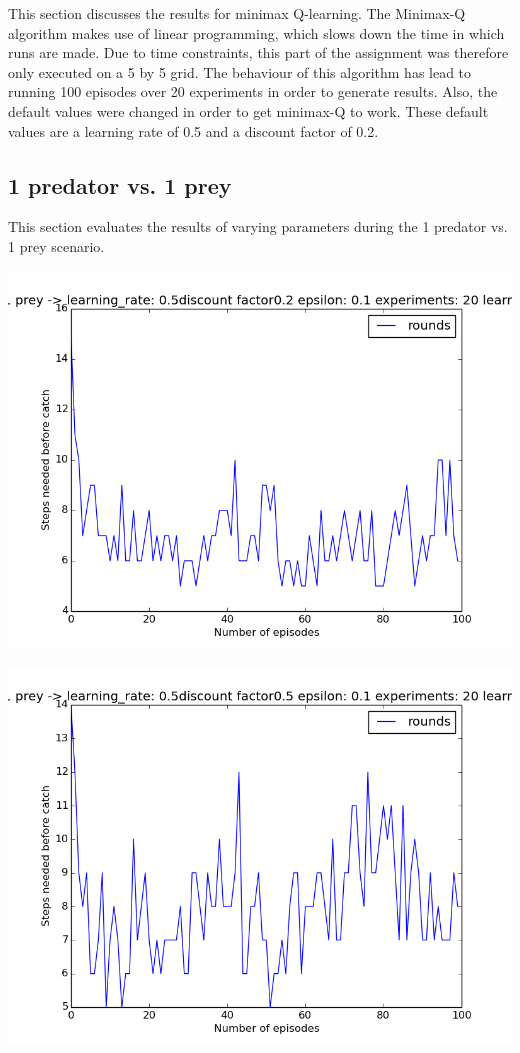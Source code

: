 This section discusses the results for minimax Q-learning. The Minimax-Q algorithm makes use of linear programming, which slows down the time in which runs are made. Due to time constraints, this part of the assignment was therefore only executed on a 5 by 5 grid. 
The behaviour of this algorithm has lead to running 100 episodes over 20 experiments in order to generate results. Also, the default values were changed in order to get minimax-Q to work. These default values are a learning rate of 0.5 and a discount factor of 0.2.

\subsection{1 predator vs. 1 prey}
This section evaluates the results of varying parameters during the 1 predator vs. 1 prey scenario.
\begin{center}
	\includegraphics[scale=0.3]{minimax_100rounds_20exp_disc02_alpha05}
	\label{graph:1vs1_disc_02}
\end{center}

\begin{center}
	\includegraphics[scale=0.3]{minimax_100rounds_20exp_disc05_alpha05}
	\label{graph:1vs1_disc_05}
\end{center}

